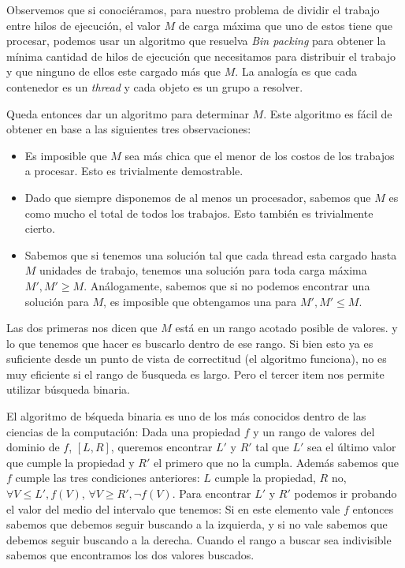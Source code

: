 Observemos que si conoci\'eramos, para nuestro problema de dividir el trabajo entre
hilos de ejecuci\'on, el valor $M$ de carga m\'axima que uno de estos tiene que
procesar, podemos usar un algoritmo que resuelva \textit{Bin packing} para
obtener la m\'inima cantidad de hilos de ejecuci\'on que necesitamos para distribuir
el trabajo y que ninguno de ellos este cargado m\'as que $M$. La analog\'ia es
que cada contenedor es un \textit{thread} y cada objeto es un grupo a resolver.

Queda entonces dar un algoritmo para determinar $M$. Este algoritmo es f\'acil
de obtener en base a las siguientes tres observaciones:

\begin{itemize}
    \item Es imposible que $M$ sea m\'as chica que el menor de los costos de los
    trabajos a procesar. Esto es trivialmente demostrable.
    \item Dado que siempre disponemos de al menos un procesador, sabemos que $M$
    es como mucho el total de todos los trabajos. Esto tambi\'en es trivialmente
    cierto.
    \item Sabemos que si tenemos una soluci\'on tal que cada thread esta cargado
    hasta $M$ unidades de trabajo, tenemos una soluci\'on para toda carga m\'axima
    $M', M' \geq M$. An\'alogamente, sabemos que si no podemos encontrar una
    soluci\'on para $M$, es imposible que obtengamos una para $M', M' \leq M$.
\end{itemize}

Las dos primeras nos dicen que $M$ est\'a en un rango acotado posible de valores.
y lo que tenemos que hacer es buscarlo dentro de ese rango. Si bien esto ya es
suficiente desde un punto de vista de correctitud (el algoritmo funciona), no es
muy eficiente si el rango de \'busqueda es largo. Pero el tercer item nos permite
utilizar b\'usqueda binaria.

El algoritmo de b\'squeda binaria es uno de los m\'as conocidos dentro de las
ciencias de la computaci\'on: Dada una propiedad $f$ y un rango de valores del
dominio de $f$, $[L,R]$, queremos encontrar $L'$ y $R'$ tal que $L'$ sea el
\'ultimo valor que cumple la propiedad y $R'$ el primero que no la cumpla.
Adem\'as sabemos que $f$ cumple las tres condiciones anteriores: $L$ cumple la
propiedad, $R$ no, $\forall V \leq L', f(V)$, $\forall V \geq R', \neg f(V)$.
Para encontrar $L'$ y $R'$ podemos ir probando el valor del medio del intervalo
que tenemos: Si en este elemento vale $f$ entonces sabemos que debemos seguir
buscando a la izquierda, y si no vale sabemos que debemos seguir buscando a la
derecha. Cuando el rango a buscar sea indivisible sabemos que encontramos los
dos valores buscados.

